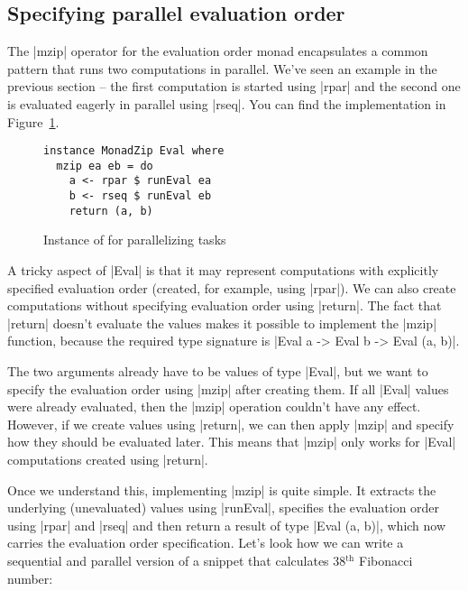 \documentclass{tmr}
\begin{document}

\subsection{Specifying parallel evaluation order}

The |mzip| operator for the evaluation order monad encapsulates a common pattern that runs two
computations in parallel. We've seen an example in the previous section -- the first 
computation is started using |rpar| and the second one is evaluated eagerly in parallel using |rseq|.
You can find the implementation in Figure~\ref{fig:eval-zip}.

\begin{figure}
\begin{verbatim}
instance MonadZip Eval where
  mzip ea eb = do
    a <- rpar $ runEval ea
    b <- rseq $ runEval eb
    return (a, b)
\end{verbatim}
\caption{Instance of  for parallelizing tasks}
\label{fig:eval-zip}
\end{figure}

A tricky aspect of |Eval| is that it may represent computations with explicitly
specified evaluation order (created, for example, using |rpar|). We can also create computations 
without specifying evaluation order using |return|. The fact that |return| doesn't evaluate the 
values makes it possible to implement the |mzip| function, because the required type signature is 
|Eval a -> Eval b -> Eval (a, b)|.

The two arguments already have to be values of type |Eval|, but we want to specify the evaluation
order using |mzip| after creating them. If all |Eval| values were already evaluated, then the |mzip|
operation couldn't have any effect. However, if we create values using |return|, we can then apply
|mzip| and specify how they should be evaluated later. This means that |mzip| only works for
|Eval| computations created using |return|.

Once we understand this, implementing |mzip| is quite simple. It extracts the underlying 
(unevaluated) values using |runEval|, specifies the evaluation order using |rpar| and |rseq| and 
then return a result of type |Eval (a, b)|, which now carries the evaluation order specification. 
Let's look how we can write a sequential and parallel version of a snippet that calculates
38$^\text{th}$ Fibonacci number:
\end{document}
